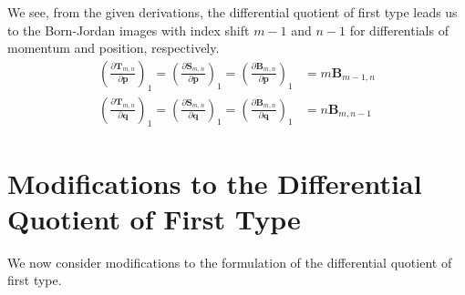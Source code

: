 \documentclass[a4paper]{article}
\theoremstyle{definition}
\begin{document}
	We see, from the given derivations, the differential quotient of first type leads us to the Born-Jordan images with index shift $m-1$ and $n-1$ for differentials of momentum and position, respectively.
	\begin{eqnarray}
		\left(\frac{\partial\textbf{T}_{m,n}}{\partial\textbf{p}}\right)_1=\left(\frac{\partial\textbf{S}_{m,n}}{\partial\textbf{p}}\right)_1=\left(\frac{\partial\textbf{B}_{m,n}}{\partial\textbf{p}}\right)_1&=m\textbf{B}_{m-1,n} \\
		\left(\frac{\partial\textbf{T}_{m,n}}{\partial\textbf{q}}\right)_1=\left(\frac{\partial\textbf{S}_{m,n}}{\partial\textbf{q}}\right)_1=\left(\frac{\partial\textbf{B}_{m,n}}{\partial\textbf{q}}\right)_1&=n\textbf{B}_{m,n-1}
	\end{eqnarray}
	
\section{Modifications to the Differential Quotient of First Type}
We now consider modifications to the formulation of the differential quotient of first type.
\end{document}
